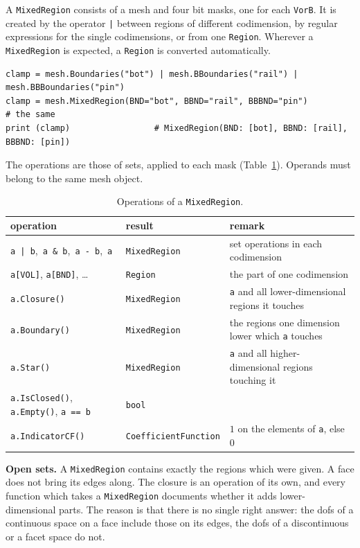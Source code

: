 \documentclass[10pt,a4paper]{article}
\newcommand{\code}[1]{\texttt{#1}}
\begin{document}
A \code{MixedRegion} consists of a mesh and four bit masks, one for each \code{VorB}. It is created by the operator \code{|} between regions of different codimension, by regular expressions for the single codimensions, or from one \code{Region}. Wherever a \code{MixedRegion} is expected, a \code{Region} is converted automatically.
\begin{lstlisting}[numbers=none,xleftmargin=0pt]
clamp = mesh.Boundaries("bot") | mesh.BBoundaries("rail") | mesh.BBBoundaries("pin")
clamp = mesh.MixedRegion(BND="bot", BBND="rail", BBBND="pin")              # the same
print (clamp)                 # MixedRegion(BND: [bot], BBND: [rail], BBBND: [pin])
\end{lstlisting}
The operations are those of sets, applied to each mask (Table~\ref{tab:ops}). Operands must belong to the same mesh object.

\begin{table}[h]\centering\small
\begin{tabular}{@{}lll@{}}\toprule
operation & result & remark\\\midrule
\code{a | b},\ \code{a \& b},\ \code{a - b},\ \code{\tld a} & \code{MixedRegion} & set operations in each codimension\\
\code{a[VOL]}, \code{a[BND]}, \dots & \code{Region} & the part of one codimension\\
\code{a.Closure()} & \code{MixedRegion} & \code{a} and all lower-dimensional regions it touches\\
\code{a.Boundary()} & \code{MixedRegion} & the regions one dimension lower which \code{a} touches\\
\code{a.Star()} & \code{MixedRegion} & \code{a} and all higher-dimensional regions touching it\\
\code{a.IsClosed()}, \code{a.Empty()}, \code{a == b} & \code{bool} & \\
\code{a.IndicatorCF()} & \code{CoefficientFunction} & $1$ on the elements of \code{a}, else $0$\\
\bottomrule\end{tabular}
\caption{Operations of a \code{MixedRegion}.}\label{tab:ops}
\end{table}

\textbf{Open sets.} A \code{MixedRegion} contains exactly the regions which were given. A face does not bring its edges along. The closure is an operation of its own, and every function which takes a \code{MixedRegion} documents whether it adds lower-dimensional parts. The reason is that there is no single right answer: the dofs of a continuous space on a face include those on its edges, the dofs of a discontinuous or a facet space do not.
\end{document}
